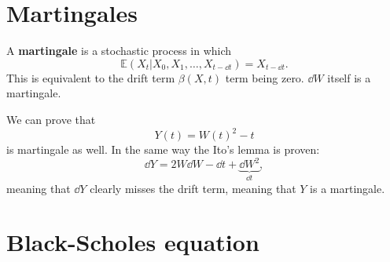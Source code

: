 \documentclass[hyperref, a4paper]{article}
\newcommand*{\concept}[1]{{\textbf{#1}}}
\begin{document}
\section{Martingales}

A \concept{martingale} is a stochastic process in which 
\begin{equation}
    \mathbb{E}(X_{t} | X_0, X_1, \ldots, X_{t-\dd{t}}) = X_{t - \dd{t}}.
\end{equation}
This is equivalent to the drift term $\beta(X, t)$ term being zero.
$\dd{W}$ itself is a martingale.

We can prove that 
\begin{equation}
    Y(t) = W(t)^2 - t 
\end{equation}
is martingale as well. In the same way the Ito's lemma is proven:
\begin{equation}
    \dd{Y} = 2 W \dd{W} - \dd{t} + \underbrace{\dd{W}^2}_{\dd{t}},
\end{equation}
meaning that $\dd{Y}$ clearly misses the drift term,
meaning that $Y$ is a martingale.

\section{Black-Scholes equation}
\end{document}

